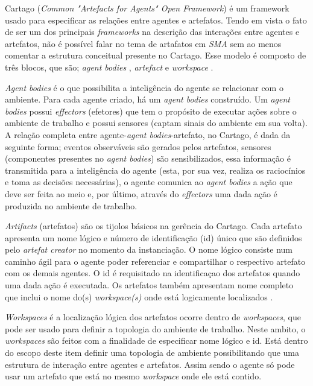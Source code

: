 Cartago (\textit{Common "Artefacts for Agents" Open Framework}) é um framework usado para especificar as relações entre agentes e artefatos. Tendo em vista o fato 
de ser um dos principais \textit{frameworks} na descrição das interações entre agentes e artefatos, não é possível falar no tema de artafatos em \textit{SMA} 
sem ao menos comentar a estrutura conceitual presente no Cartago. Esse modelo é composto de três blocos, que são; \textit{agent bodies} , \textit{artefact} e \textit{workspace} \cite{cartago}.

 \textit{Agent bodies} é  o que possibilita a inteligência do agente se relacionar com o ambiente. Para cada agente criado, há um \textit{agent bodies} construído.
 Um \textit{agent bodies} possui \textit{effectors} (efetores) que tem o propósito de executar ações sobre o ambiente de trabalho e possui sensores (captam 
 sinais do ambiente em sua volta). A relação completa entre agente-\textit{agent bodies}-artefato, no Cartago, é dada da seguinte forma; eventos observáveis são 
 gerados pelos artefatos, sensores (componentes presentes no \textit{agent bodies}) são sensibilizados, essa informação é transmitida para a inteligência do 
 agente (esta, por sua vez, realiza os raciocínios e toma as  decisões necessárias), o agente comunica ao \textit{agent bodies} a ação que deve ser feita ao 
 meio e, por último, através do \textit{effectors} uma dada ação é produzida no ambiente de trabalho. 

 \textit{Artifacts} (artefatos) são os tijolos básicos na gerência do Cartago. Cada artefato apresenta um nome lógico e número de identificação (id)
 único que são definidos pelo \textit{artefat creator} no momento da instanciação. O nome lógico consiste num caminho ágil para o agente poder referenciar 
 e compartilhar o respectivo artefato com os demais agentes. O id é requisitado na identificaçao dos artefatos quando uma dada ação é executada. Os artefatos
 também apresentam nome completo que inclui o nome do(s) \textit{workspace(s)} onde está logicamente localizados \cite{cartago}.

 \textit{Workspaces} é a localização lógica dos artefatos ocorre dentro de \textit{workspaces}, que pode ser usado para definir a topologia do ambiente de trabalho.
 Neste ambito, o \textit{workspaces} são feitos com a finalidade de especificar nome lógico e id. Está dentro do escopo deste item definir uma topologia de ambiente
 possibilitando que uma estrutura de interação entre agentes e artefatos. Assim sendo o agente só pode usar
 um artefato que está no mesmo \textit{workspace} onde ele está contido. 